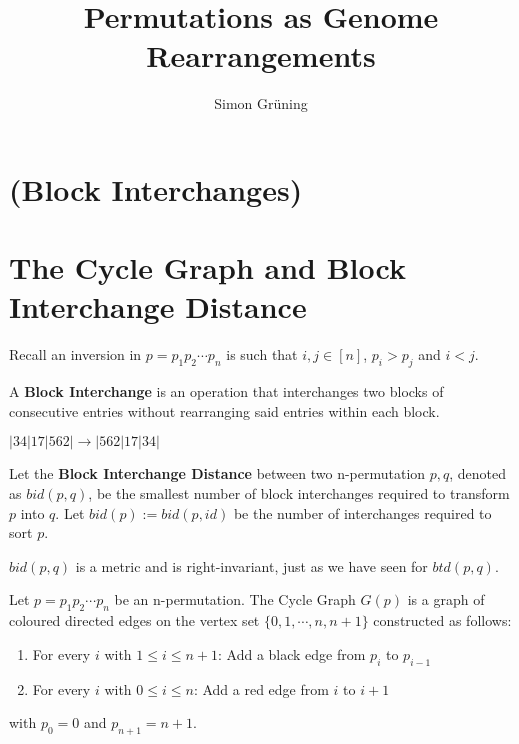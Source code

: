 


\title{Permutations as Genome Rearrangements}
\author{Simon Gr\"uning}
\address[Simon Gr\"uning]{University of Zurich, R\"{a}mistrasse 71, 8006 Zurich}


\maketitle

\section*{(Block Interchanges)}


\clearpage




\section{The Cycle Graph and Block Interchange Distance}

\begin{remark}
Recall an inversion in $p = p_1 p_2 \cdots p_n $ is such that $ i,j \in [ n ]$, $ p_i > p_j$ and $i < j$.
\end{remark}

\begin{definition}
A \textbf{Block Interchange} is an operation that interchanges two blocks of consecutive entries without rearranging said entries within each block.
\end{definition}

\begin{example}
 $ |34|17|562| \rightarrow |562|17|34| $
\end{example}

\begin{definition}
Let the \textbf{Block Interchange Distance} between two n-permutation $p,q$, denoted as $bid(p,q)$, be the smallest number of block interchanges required to transform $p$ into $q$. Let $bid(p) := bid(p,id)$ be the number of interchanges required to sort $p$.
\end{definition}

\begin{remark}
$bid(p,q)$ is a metric and is right-invariant, just as we have seen for $btd(p,q)$.
\end{remark}

\begin{definition}
Let $p = p_1 p_2 \cdots p_n$ be an n-permutation. The  Cycle Graph $G(p)$ is a graph of coloured directed edges on the vertex set $\{ 0,1, \cdots ,n,n+1 \}$ constructed as follows:
\begin{enumerate}
\item For every $i$ with $1 \leq i \leq n+1$: Add a black edge from $p_i$ to $p_{i-1}$
\item For every $i$ with $0 \leq i \leq n$: Add a red edge from $i$ to $i+1$
\end{enumerate}
with $p_0 = 0$ and $p_{n+1} = n+1$.
\end{definition}

